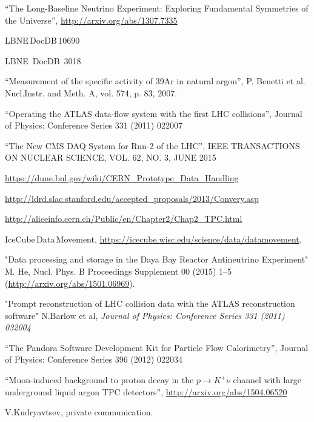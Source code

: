 \begin{thebibliography}{99}

 ``The Long-Baseline Neutrino Experiment: Exploring Fundamental Symmetries of the Universe'',  \url{http://arxiv.org/abs/1307.7335}

 LBNE\,DocDB\,10690  %

 LBNE~DocDB~3018%

 ``Measurement of the specific activity of 39Ar in natural argon'', P. Benetti et al. Nucl.Instr. and Meth. A, vol. 574, p. 83, 2007.

 ``Operating the ATLAS data-flow system with the first LHC collisions'', Journal of Physics: Conference Series 331 (2011) 022007

 ``The New CMS DAQ System for Run-2 of the LHC'', IEEE TRANSACTIONS ON NUCLEAR SCIENCE, VOL. 62, NO. 3, JUNE 2015

 \url{https://dune.bnl.gov/wiki/CERN_Prototype_Data_Handling}

 \url{http://ldrd.slac.stanford.edu/accepted_proposals/2013/Convery.asp}

 \url{http://aliceinfo.cern.ch/Public/en/Chapter2/Chap2_TPC.html}

 IceCube\,Data\,Movement, \url{https://icecube.wisc.edu/science/data/datamovement}.

"Data processing and storage in the Daya Bay Reactor Antineutrino Experiment" M. He, Nucl. Phys. B Proceedings Supplement 00 (2015) 1–5 (\url{http://arxiv.org/abs/1501.06969}).

 "Prompt reconstruction of LHC collision data with the ATLAS reconstruction software" N.Barlow et al, \textit{Journal of Physics: Conference Series 331 (2011) 032004}

 ``The Pandora Software Development Kit for Particle Flow Calorimetry'', Journal of Physics: Conference Series 396 (2012) 022034

 ``Muon-induced background to proton decay in the $p \rightarrow K^+\nu$ channel with large underground liquid argon TPC detectors'', \url{http://arxiv.org/abs/1504.06520}

 V.Kudryavtsev, private communication.

\end{thebibliography}